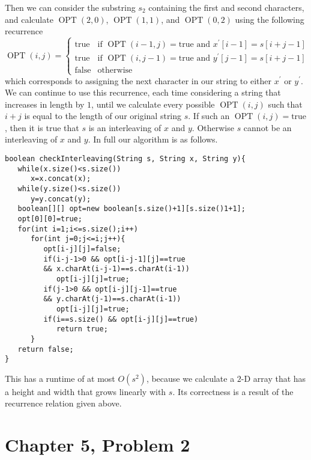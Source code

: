 \documentclass[12pt]{article}
\begin{document}
Then we can consider the substring \(s_2\) containing the first and second characters, and calculate \(\operatorname{OPT}(2,0)\),
\(\operatorname{OPT}(1,1)\), and \(\operatorname{OPT}(0,2)\) using the following recurrence
\[
        \operatorname{OPT}(i,j)=\begin{cases}
                \text{true} & \text{if }\operatorname{OPT}(i-1,j)=\text{true and }x^\prime[i-1]=s[i+j-1]\\
                \text{true} & \text{if }\operatorname{OPT}(i,j-1)=\text{true and }y^\prime[j-1]=s[i+j-1]\\
                \text{false} & \text{otherwise}
        \end{cases}
\]
which corresponds to assigning the next character in our string to either \(x^\prime\) or \(y^\prime\). We can continue to use this recurrence,
each time considering a string that increases in length by \(1\), until we calculate every possible \(\operatorname{OPT}(i,j)\) such that \(i+j\) is
equal to the length of our original string \(s\). If such an \(\operatorname{OPT}(i,j)=\text{true}\), then it is true that \(s\) is an interleaving
of \(x\) and \(y\). Otherwise \(s\) cannot be an interleaving of \(x\) and \(y\). In full our algorithm is as follows.

\begin{verbatim}
boolean checkInterleaving(String s, String x, String y){
   while(x.size()<s.size())
      x=x.concat(x);
   while(y.size()<s.size())
      y=y.concat(y);
   boolean[][] opt=new boolean[s.size()+1][s.size()1+1];
   opt[0][0]=true;
   for(int i=1;i<=s.size();i++)
      for(int j=0;j<=i;j++){
         opt[i-j][j]=false;
         if(i-j-1>0 && opt[i-j-1][j]==true
         && x.charAt(i-j-1)==s.charAt(i-1))
            opt[i-j][j]=true;
         if(j-1>0 && opt[i-j][j-1]==true
         && y.charAt(j-1)==s.charAt(i-1))
            opt[i-j][j]=true;
         if(i==s.size() && opt[i-j][j]==true)
            return true;
      }
   return false;
}
\end{verbatim}

This has a runtime of at most \(O(s^2)\), because we calculate a \(2\)-D array that has a height and width that grows linearly with \(s\). Its correctness
is a result of the recurrence relation given above.

\pagebreak

\section*{Chapter 5, Problem 2}
\end{document}
